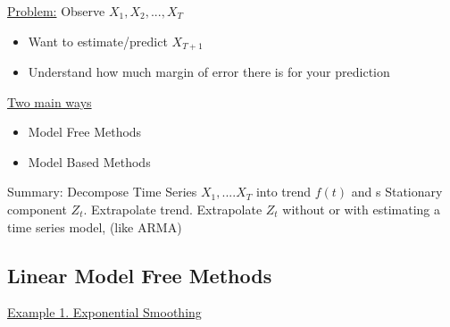 \underline{Problem:} \quad Observe $X_1, X_2,...,X_T$\\
\begin{itemize}
    \item  Want to estimate/predict \quad $X_{T+1}$
    \item Understand how much margin of error there is for your prediction
\end{itemize}

\underline{Two main ways}
\begin{itemize}
    \item Model Free Methods
    \item Model Based Methods
\end{itemize}


Summary: \quad Decompose Time Series $X_1,....X_T$ into trend $f(t)$ and s Stationary component $Z_t$. Extrapolate trend. Extrapolate $Z_t$ without or with estimating a time series model, (like ARMA)

\subsection{Linear Model Free Methods}

\underline{Example 1. Exponential Smoothing}

